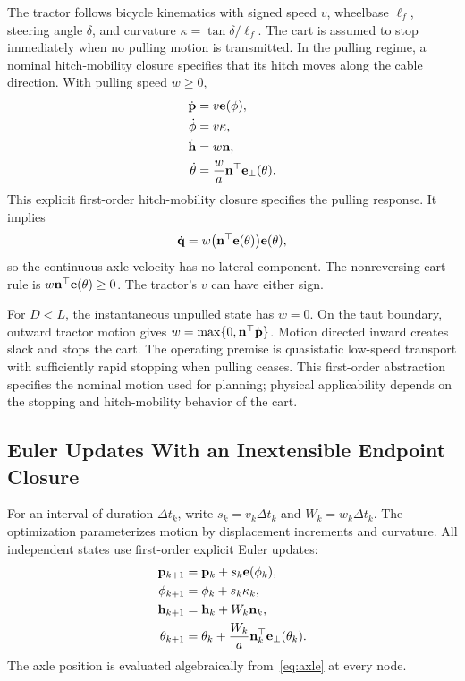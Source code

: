 The tractor follows bicycle kinematics with signed speed $v$, wheelbase $\ell_f$, steering angle $\delta$, and curvature $\kappa=\tan\delta/\ell_f$. The cart is assumed to stop immediately when no pulling motion is transmitted. In the pulling regime, a nominal hitch-mobility closure specifies that its hitch moves along the cable direction. With pulling speed $w\geq0$,
\begin{equation}\begin{aligned}
\dot{\mathbf p}&=v\mathbf e(\phi),\\
\dot\phi&=v\kappa,\\
\dot{\mathbf h}&=w\mathbf n,\\
\dot\theta&=\frac{w}{a}\mathbf n^\top\mathbf e_\perp(\theta).
\end{aligned}\label{eq:continuous}\end{equation}
This explicit first-order hitch-mobility closure specifies the pulling response. It implies
\begin{equation}
\dot{\mathbf q}=w\bigl(\mathbf n^\top\mathbf e(\theta)\bigr)\mathbf e(\theta),
\label{eq:nonholonomic}
\end{equation}
so the continuous axle velocity has no lateral component. The nonreversing cart rule is $w\mathbf n^\top\mathbf e(\theta)\geq0$. The tractor's $v$ can have either sign.

For $D<L$, the instantaneous unpulled state has $w=0$. On the taut boundary, outward tractor motion gives $w=\max\{0,\mathbf n^\top\dot{\mathbf p}\}$. Motion directed inward creates slack and stops the cart. The operating premise is quasistatic low-speed transport with sufficiently rapid stopping when pulling ceases. This first-order abstraction specifies the nominal motion used for planning; physical applicability depends on the stopping and hitch-mobility behavior of the cart.

\subsection{Euler Updates With an Inextensible Endpoint Closure}
For an interval of duration $\Delta t_k$, write $s_k=v_k\Delta t_k$ and $W_k=w_k\Delta t_k$. The optimization parameterizes motion by displacement increments and curvature. All independent states use first-order explicit Euler updates:
\begin{equation}\begin{aligned}
\mathbf p_{k+1}&=\mathbf p_k+s_k\mathbf e(\phi_k),\\
\phi_{k+1}&=\phi_k+s_k\kappa_k,\\
\mathbf h_{k+1}&=\mathbf h_k+W_k\mathbf n_k,\\
\theta_{k+1}&=\theta_k+\frac{W_k}{a}\mathbf n_k^\top\mathbf e_\perp(\theta_k).
\end{aligned}\label{eq:euler}\end{equation}
The axle position is evaluated algebraically from~\eqref{eq:axle} at every node.

